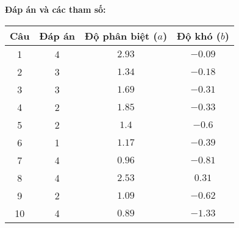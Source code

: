 \noindent\textbf{Đáp án và các tham số:}
\begin{longtable}{|c|c|c|c|}\hline
	\textbf{Câu} & \textbf{Đáp án} & \textbf{Độ phân biệt ($a$)} & \textbf{Độ khó ($b$)} \\\hline
	\endhead
	1  & 4 & $2.93$ & $-0.09$ \\ \hline
	2  & 3 & $1.34$ & $-0.18$ \\ \hline
	3  & 3 & $1.69$ & $-0.31$ \\ \hline
	4  & 2 & $1.85$ & $-0.33$ \\ \hline
	5  & 2 & $1.4$  & $-0.6$  \\ \hline
	6  & 1 & $1.17$ & $-0.39$ \\ \hline
	7  & 4 & $0.96$ & $-0.81$ \\ \hline
	8  & 4 & $2.53$ & $0.31$  \\ \hline
	9  & 2 & $1.09$ & $-0.62$ \\ \hline
	10 & 4 & $0.89$ & $-1.33$ \\ \hline
\end{longtable}

